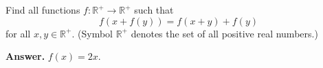 Find all functions $f : \mathbb{R}^{+} \to \mathbb{R}^{+}$ such that
\[ f(x + f(y)) = f(x + y) + f(y) \tag{1} \]
for all $x, y \in \mathbb{R}^{+}$. (Symbol $\mathbb{R}^{+}$ denotes the set of all positive real numbers.)

\textbf{Answer.} $f(x) = 2x$.
